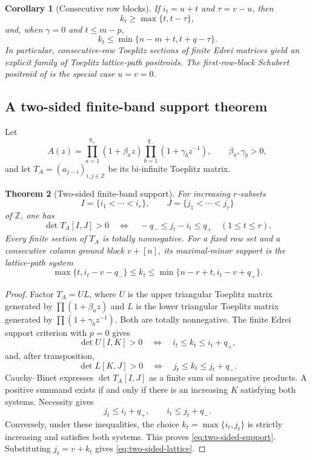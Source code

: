 \documentclass[11pt]{amsart}
\newtheorem{theorem}{Theorem}[section]
\newtheorem{corollary}[theorem]{Corollary}
\theoremstyle{definition}
\theoremstyle{remark}
\newcommand{\Z}{\mathbb Z}
\begin{document}
\begin{corollary}[Consecutive row blocks]\label{cor:Edrei-consecutive}
If $i_t=u+t$ and $\tau=v-u$, then
\[
 k_t\ge\max\{t,t-\tau\},
\]
and, when $\gamma=0$ and $t\le m-p$,
\[
 k_t\le\min\{n-m+t,t+q-\tau\}.
\]
In particular, consecutive-row Toeplitz sections of finite Edrei matrices yield an explicit family of Toeplitz lattice-path positroids.  The first-row-block Schubert positroid of \cite[Corollary~24]{CGQlow} is the special case $u=v=0$.
\end{corollary}

\subsection{A two-sided finite-band support theorem}

Let
\begin{equation}\label{eq:two-sided-symbol}
 A(z)=
 \prod_{a=1}^{q_+}(1+\beta_az)
 \prod_{b=1}^{q_-}(1+\gamma_bz^{-1}),
 \qquad \beta_a,\gamma_b>0,
\end{equation}
and let $T_A=(a_{j-i})_{i,j\in\Z}$ be its bi-infinite Toeplitz matrix.

\begin{theorem}[Two-sided finite-band support]\label{thm:two-sided-band}
For increasing $r$-subsets
\[
 I=\{i_1<\cdots<i_r\},
 \qquad
 J=\{j_1<\cdots<j_r\}
\]
of $\Z$, one has
\begin{equation}\label{eq:two-sided-support}
 \det T_A[I,J]>0
 \quad\Longleftrightarrow\quad
 -q_-\le j_t-i_t\le q_+
 \quad(1\le t\le r).
\end{equation}
Every finite section of $T_A$ is totally nonnegative.  For a fixed row set and a consecutive column ground block $v+[n]$, its maximal-minor support is the lattice-path system
\begin{equation}\label{eq:two-sided-lattice}
 \max\{t,i_t-v-q_-\}
 \le k_t\le
 \min\{n-r+t,i_t-v+q_+\}.
\end{equation}
\end{theorem}

\begin{proof}
Factor $T_A=UL$, where $U$ is the upper triangular Toeplitz matrix generated by $\prod(1+\beta_az)$ and $L$ is the lower triangular Toeplitz matrix generated by $\prod(1+\gamma_bz^{-1})$.  Both are totally nonnegative.  The finite Edrei support criterion with $p=0$ gives
\[
 \det U[I,K]>0
 \quad\Longleftrightarrow\quad
 i_t\le k_t\le i_t+q_+,
\]
and, after transposition,
\[
 \det L[K,J]>0
 \quad\Longleftrightarrow\quad
 j_t\le k_t\le j_t+q_-.
\]
Cauchy--Binet expresses $\det T_A[I,J]$ as a finite sum of nonnegative products.  A positive summand exists if and only if there is an increasing $K$ satisfying both systems.  Necessity gives
\[
 j_t\le i_t+q_+,
 \qquad i_t\le j_t+q_-.
\]
Conversely, under these inequalities, the choice $k_t=\max\{i_t,j_t\}$ is strictly increasing and satisfies both systems.  This proves \eqref{eq:two-sided-support}.  Substituting $j_t=v+k_t$ gives \eqref{eq:two-sided-lattice}.
\end{proof}
\end{document}
